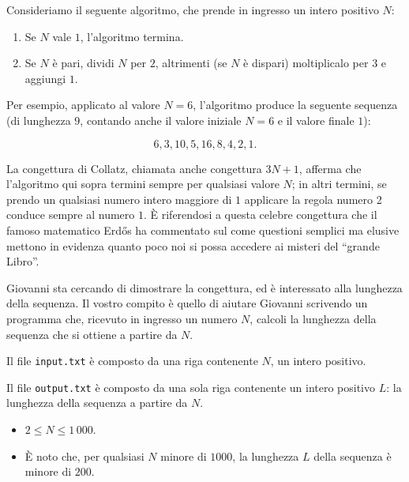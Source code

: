 \renewcommand{\nomebreve}{collatz}
\renewcommand{\titolo}{La Congettura di Collatz}
\renewcommand{\difficolta}{\normalsize \textsc{[Difficoltà D=1]}}

\introduzione{}

Consideriamo il seguente algoritmo, che prende in ingresso un intero
positivo $N$:

\begin{enumerate}[noitemsep]
  \item Se $N$ vale $1$, l’algoritmo termina.
  \item Se $N$ è pari, dividi $N$ per $2$, altrimenti (se $N$ è
    dispari) moltiplicalo per $3$ e aggiungi $1$.
\end{enumerate}

\noindent
Per esempio, applicato al valore $N=6$, l’algoritmo produce la
seguente sequenza (di lunghezza $9$, contando anche il valore iniziale
$N=6$ e il valore finale $1$):

$$6, 3, 10, 5, 16, 8, 4, 2, 1.$$

La congettura di Collatz, chiamata anche congettura $3N+1$, afferma
che l’algoritmo qui sopra termini sempre per qualsiasi valore $N$; in
altri termini, se prendo un qualsiasi numero intero maggiore di $1$
applicare la regola numero 2 conduce sempre al numero $1$.
È riferendosi a questa celebre congettura che il famoso matematico
Erdős ha commentato sul come questioni semplici ma elusive mettono in
evidenza quanto poco noi si possa accedere ai misteri del ``grande
Libro''.

Giovanni sta cercando di dimostrare la congettura, ed è interessato
alla lunghezza della sequenza. Il vostro compito è quello di aiutare
Giovanni scrivendo un programma che, ricevuto in ingresso un numero
$N$, calcoli la lunghezza della sequenza che si ottiene a partire da
$N$.

Il file \verb'input.txt' è composto da una riga contenente $N$, un
intero positivo.

Il file \verb'output.txt' è composto da una sola riga contenente un
intero positivo $L$: la lunghezza della sequenza a partire da $N$.

\begin{itemize}[nolistsep, noitemsep]
  \item $2 \le N \le 1\,000 $.
  \item È noto che, per qualsiasi $N$ minore di $1000$, la lunghezza
    $L$ della sequenza è minore di $200$.
\end{itemize}


